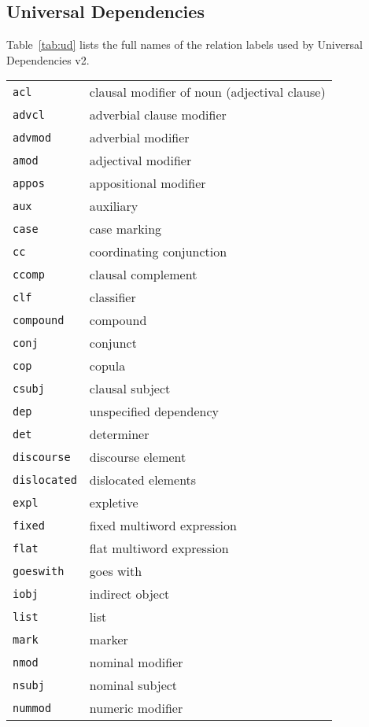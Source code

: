 \subsection{Universal Dependencies}

Table~\ref{tab:ud} lists the full names of the
relation labels used by Universal Dependencies v2.

\begin{table}[ht]
\centering
\footnotesize
\begin{tabular}{ll}
\texttt{acl} & clausal modifier of noun (adjectival clause) \\
\texttt{advcl} & adverbial clause modifier \\
\texttt{advmod} & adverbial modifier \\
\texttt{amod} & adjectival modifier \\
\texttt{appos} & appositional modifier \\
\texttt{aux} & auxiliary \\
\texttt{case} & case marking \\
\texttt{cc} & coordinating conjunction \\
\texttt{ccomp} & clausal complement \\
\texttt{clf} & classifier \\
\texttt{compound} & compound \\
\texttt{conj} & conjunct \\
\texttt{cop} & copula \\
\texttt{csubj} & clausal subject \\
\texttt{dep} & unspecified dependency \\
\texttt{det} & determiner \\
\texttt{discourse} & discourse element \\
\texttt{dislocated} & dislocated elements \\
\texttt{expl} & expletive \\
\texttt{fixed} & fixed multiword expression \\
\texttt{flat} & flat multiword expression \\
\texttt{goeswith} & goes with \\
\texttt{iobj} & indirect object \\
\texttt{list} & list \\
\texttt{mark} & marker \\
\texttt{nmod} & nominal modifier \\
\texttt{nsubj} & nominal subject \\
\texttt{nummod} & numeric modifier \\

\end{tabular}
\end{table}
